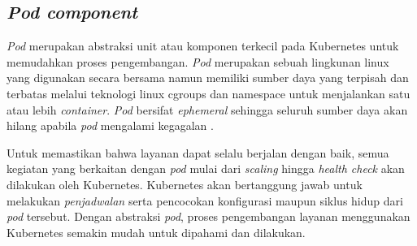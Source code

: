 \subsection{\textit{Pod component}}

\textit{Pod} merupakan abstraksi unit atau komponen terkecil pada Kubernetes untuk memudahkan proses pengembangan. \textit{Pod} merupakan sebuah lingkunan linux yang digunakan secara bersama namun memiliki sumber daya yang terpisah dan terbatas melalui teknologi linux cgroups dan namespace untuk menjalankan satu atau lebih \textit{container}. \textit{Pod} bersifat \textit{ephemeral} sehingga seluruh sumber daya akan hilang apabila \textit{pod} mengalami kegagalan \parencite{pod}.

Untuk memastikan bahwa layanan dapat selalu berjalan dengan baik, semua kegiatan yang berkaitan dengan \textit{pod} mulai dari \textit{scaling} hingga \textit{health check} akan dilakukan oleh Kubernetes. Kubernetes akan bertanggung jawab untuk melakukan \textit{penjadwalan} serta pencocokan konfigurasi maupun siklus hidup dari \textit{pod} tersebut. Dengan abstraksi \textit{pod}, proses pengembangan layanan menggunakan Kubernetes semakin mudah untuk dipahami dan dilakukan.
